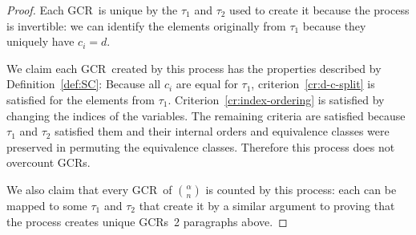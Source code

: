 \documentclass[10pt,a4paper]{article}
\newcommand{\gencrulenospace}{GCR}
\newcommand{\gencrule}{\gencrulenospace~}
\newcommand{\gencrules}{\gencrulenospace s~}
\newcommand{\gencrulesnospace}{\gencrulenospace s}
\newcommand{\numpoints}{n}
\newcommand{\inumpoints}{i}
\theoremstyle{plain}
\theoremstyle{definition}
\begin{document}
\begin{proof}
Each \gencrule is unique by the $\tau_1$ and $\tau_2$ used to create it because the process is invertible: we can identify the elements originally from $\tau_1$ because they uniquely have $c_{\inumpoints}=d$.

We claim each \gencrule created by this process has the properties described by Definition~\ref{def:SC}: Because all $c_{\inumpoints}$ are equal for $\tau_1$, criterion~\ref{cr:d-c-split} is satisfied for the elements from $\tau_1$.
Criterion~\ref{cr:index-ordering} is satisfied by changing the indices of the variables.
The remaining criteria are satisfied because $\tau_1$ and $\tau_2$ satisfied them and their internal orders and equivalence classes were preserved in permuting the equivalence classes. Therefore this process does not overcount \gencrulesnospace.

We also claim that every \gencrule of $\binom{\alpha}{\numpoints}$ is counted by this process: each can be mapped to some $\tau_1$ and $\tau_2$ that create it by a similar argument to proving that the process creates unique \gencrules 2 paragraphs above.
\end{proof}
\end{document}
